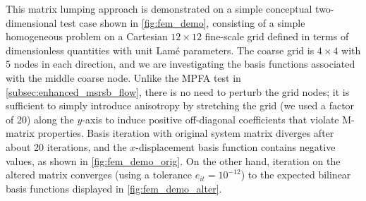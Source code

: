 This matrix lumping approach is demonstrated on a simple conceptual two-dimensional test case shown in \cref{fig:fem_demo}, consisting of a simple homogeneous problem on a Cartesian $12 \times 12$ fine-scale grid defined in terms of dimensionless quantities with unit Lam\'{e} parameters.  The coarse grid is $4 \times 4$ with 5 nodes in each direction, and we are investigating the basis functions associated with the middle coarse node.   Unlike the MPFA test in \cref{subsec:enhanced_msrsb_flow}, there is no need to perturb the grid nodes; it is sufficient to simply introduce anisotropy by stretching the grid (we used a factor of 20) along the $y$-axis to induce positive off-diagonal coefficients that violate M-matrix properties.   Basis iteration with original system matrix diverges after about 20 iterations, and the $x$-displacement basis function contains negative values, as shown in \cref{fig:fem_demo_orig}.   On the other hand, iteration on the altered matrix converges (using a tolerance $e_{it} = 10^{-12}$) to the expected bilinear basis functions displayed in \cref{fig:fem_demo_alter}.

